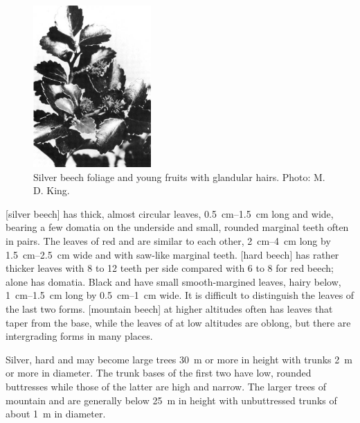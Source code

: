 \begin{figure}
	\includegraphics[width=0.4\textwidth]{graphics/fig_069}
	\centering
	\caption[Silver beech foliage and young fruits]{Silver beech foliage and young fruits with glandular hairs.
	Photo: M. D. King.}%
	\label{fig:69silverbeech}
\end{figure}

[silver beech] has thick, almost circular leaves, \SIrange{0.5}{1.5}{\centi\metre} long and wide, bearing a few domatia on the underside and small, rounded marginal teeth often in pairs.
The leaves of red and  are similar to each other, \SIrange{2}{4}{\centi\metre} long by \SIrange{1.5}{2.5}{\centi\metre} wide and with saw-like marginal teeth.
[hard beech] has rather thicker leaves with 8 to 12 teeth per side compared with 6 to 8 for red beech;  alone has domatia.
Black and  have small smooth-margined leaves, hairy below, \SIrange{1}{1.5}{\centi\metre} long by \SIrange{0.5}{1}{\centi\metre} wide.
It is difficult to distinguish the leaves of the last two forms.
[mountain beech] at higher altitudes often has leaves that taper from the base, while the leaves of  at low altitudes are oblong, but there are intergrading forms in many places.

Silver, hard and  may become large trees \SI{30}{\metre} or more in height with trunks \SI{2}{\metre} or more in diameter.
The trunk bases of the first two have low, rounded buttresses while those of the latter are high and narrow.
The larger trees of mountain and  are generally below \SI{25}{\metre} in height with unbuttressed trunks of about \SI{1}{\metre} in diameter.

